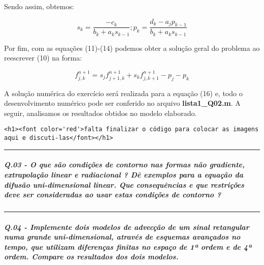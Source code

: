 \documentclass[11pt]{article}
\begin{document}
Sendo assim, obtemos:

\begin{equation}
    s_k = \frac{-c_k}{b_k + a_ks_{k-1}}; p_k = \frac{d_k - a_jp_{k-1}}{b_k + a_ks_{k-1}}
\end{equation}

Por fim, com as equações (11)-(14) podemos obter a solução geral do
problema ao reescrever (10) na forma:

\begin{equation}
    f^{n+1}_{j,k} = s_{j}f^{n+1}_{j+1,k} + s_{k}f^{n+1}_{j,k+1}- p_{j} - p_{k}
\end{equation}

A solução numérica do exercício será realizada para a equação (16) e,
todo o desenvolvimento numérico pode ser conferido no arquivo
\textbf{lista1\_Q02.m}. A seguir, analisamos os resultados obtidos no
modelo elaborado.

\begin{verbatim}
<h1><font color='red'>falta finalizar o código para colocar as imagens aqui e discuti-las</font></h1>
\end{verbatim}

    \begin{center}\rule{0.5\linewidth}{\linethickness}\end{center}

    \subparagraph{Q.03 - O que são condições de contorno nas formas não
gradiente, extrapolação linear e radiacional ? Dê exemplos para a
equação da difusão uni-dimensional linear. Que consequências e que
restrições deve ser consideradas ao usar estas condições de contorno
?}\label{q.03---o-que-suxe3o-condiuxe7uxf5es-de-contorno-nas-formas-nuxe3o-gradiente-extrapolauxe7uxe3o-linear-e-radiacional-duxea-exemplos-para-a-equauxe7uxe3o-da-difusuxe3o-uni-dimensional-linear.-que-consequuxeancias-e-que-restriuxe7uxf5es-deve-ser-consideradas-ao-usar-estas-condiuxe7uxf5es-de-contorno}

    \begin{center}\rule{0.5\linewidth}{\linethickness}\end{center}

    \subparagraph{Q.04 - Implemente dois modelos de advecção de um sinal
retangular numa grande uni-dimensional, através de esquemas avançados no
tempo, que utilizam diferenças finitas no espaço de 1ª ordem e de 4ª
ordem. Compare os resultados dos dois
modelos.}\label{q.04---implemente-dois-modelos-de-advecuxe7uxe3o-de-um-sinal-retangular-numa-grande-uni-dimensional-atravuxe9s-de-esquemas-avanuxe7ados-no-tempo-que-utilizam-diferenuxe7as-finitas-no-espauxe7o-de-1uxaa-ordem-e-de-4uxaa-ordem.-compare-os-resultados-dos-dois-modelos.}
\end{document}
